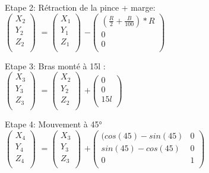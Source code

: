 Etape 2: Rétraction de la pince + marge: \\

$
\begin{pmatrix}
  X_{2} \\
  Y_{2} \\
  Z_{2} \\
\end{pmatrix}
$
\vspace{3mm} %
$
=
\begin{pmatrix}
  X_{1} \\
  Y_{1} \\
  Z_{1} \\
\end{pmatrix}
$
\vspace{3mm} %
$
 -
\begin{pmatrix}
 (\frac{R}{2} + \frac{B}{100})*R  \\
  0 \\
  0 \\
\end{pmatrix}
$

Etape 3: Bras monté à 15l : \\

$
\begin{pmatrix}
  X_{3} \\
  Y_{3} \\
  Z_{3} \\
\end{pmatrix}
$
\vspace{3mm} %
$
=
\begin{pmatrix}
  X_{2} \\
  Y_{2} \\
  Z_{2} \\
\end{pmatrix}
$
\vspace{3mm} %
$
 +
\begin{pmatrix}
  0 \\
  0 \\
  15l \\
\end{pmatrix}
$

Etape 4: Mouvement à 45° \\

$
\begin{pmatrix}
  X_{4} \\
  Y_{4} \\
  Z_{4} \\
\end{pmatrix}
$
\vspace{3mm} %
$
=
\begin{pmatrix}
  X_{3} \\
  Y_{3} \\
  Z_{3} \\
\end{pmatrix}
$
\vspace{3mm} %
$
 +
\begin{pmatrix}
 (cos(45)-sin(45) & 0 \\
  sin(45)-cos(45) & 0\\
  0 & 1 \\
\end{pmatrix}
$

